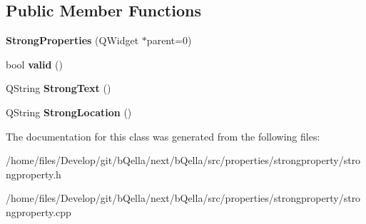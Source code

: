 \subsection*{Public Member Functions}
\begin{DoxyCompactItemize}
\item 
\hypertarget{classStrongProperties_aa610f8fd98add236cf8af447993563b7}{
{\bfseries StrongProperties} (QWidget $\ast$parent=0)}
\label{classStrongProperties_aa610f8fd98add236cf8af447993563b7}

\item 
\hypertarget{classStrongProperties_a0b2178836af5c19f79c76af2dc81c7df}{
bool {\bfseries valid} ()}
\label{classStrongProperties_a0b2178836af5c19f79c76af2dc81c7df}

\item 
\hypertarget{classStrongProperties_a289cad05c2da8655bab850afff3b73ec}{
QString {\bfseries StrongText} ()}
\label{classStrongProperties_a289cad05c2da8655bab850afff3b73ec}

\item 
\hypertarget{classStrongProperties_afa28e9f3e3465e9bc215e2c434537e53}{
QString {\bfseries StrongLocation} ()}
\label{classStrongProperties_afa28e9f3e3465e9bc215e2c434537e53}

\end{DoxyCompactItemize}


The documentation for this class was generated from the following files:\begin{DoxyCompactItemize}
\item 
/home/files/Develop/git/bQella/next/bQella/src/properties/strongproperty/strongproperty.h\item 
/home/files/Develop/git/bQella/next/bQella/src/properties/strongproperty/strongproperty.cpp\end{DoxyCompactItemize}
